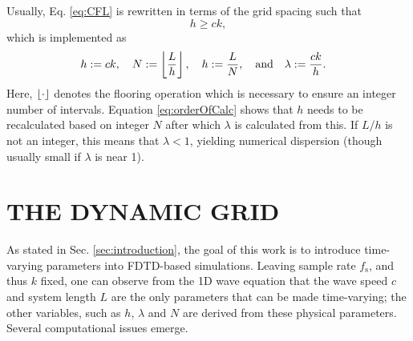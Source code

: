 \documentclass[fleqn]{jaes}
\begin{document}
Usually, Eq. \eqref{eq:CFL} is rewritten in terms of the grid spacing such that
\begin{equation}\label{eq:stabilityCond}
    h \geq c k,
\end{equation}
which is implemented as
\begin{equation}\label{eq:orderOfCalc}
    \!\!\!\!\!h:=ck, \quad N := \floor[\frac{L}{h}],\quad h := \frac{L}{N},\qaq \lambda := \frac{ck}{h}.
\end{equation}
Here, $\floor[\cdot]$ denotes the flooring operation which is necessary to ensure an integer number of intervals. Equation \eqref{eq:orderOfCalc} shows that $h$ needs to be recalculated based on integer $N$ after which $\lambda$ is calculated from this. If $L/h$ is not an integer, this means that $\lambda < 1$, yielding numerical dispersion (though usually small if $\lambda$ is near 1).

\section{THE DYNAMIC GRID}\label{sec:dynamicGrid}
As stated in Sec. \ref{sec:introduction}, the goal of this work is to introduce time-varying parameters into FDTD-based simulations. 
Leaving sample rate $f_\text{s}$, and thus $k$ fixed, one can observe from the 1D wave equation that the wave speed $c$ and system length $L$ are the only parameters that can be made time-varying; the other variables, such as $h$, $\lambda$ and $N$ are derived from these physical parameters. Several computational issues emerge. 
\end{document}
